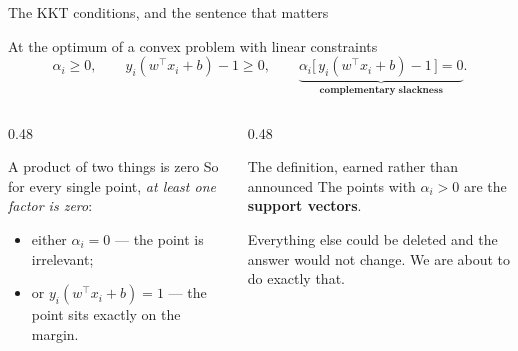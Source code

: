 \documentclass[aspectratio=169]{beamer}
\begin{document}
\begin{frame}[shrink=5]{The KKT conditions, and the sentence that matters}
  \begin{block}{At the optimum of a convex problem with linear constraints}
    \[
      \alpha_i \ge 0, \qquad
      y_i(w^\top x_i + b) - 1 \ge 0, \qquad
      \underbrace{\alpha_i\bigl[\,y_i(w^\top x_i + b) - 1\,\bigr] = 0}
        _{\textbf{complementary slackness}} .
    \]
  \end{block}
  \begin{columns}[T]
    \begin{column}{0.48\textwidth}
      \begin{exampleblock}{A product of two things is zero}
        So for every single point, \emph{at least one factor is zero}:
        \begin{itemize}
          \item either $\alpha_i = 0$ --- the point is irrelevant;
          \item or $y_i(w^\top x_i + b) = 1$ --- the point sits exactly on
            the margin.
        \end{itemize}
      \end{exampleblock}
    \end{column}
    \begin{column}{0.48\textwidth}
      \begin{alertblock}{The definition, earned rather than announced}
        \centering\large
        The points with $\alpha_i > 0$ are the\\ \textbf{support vectors}.

        \smallskip
        \normalsize Everything else could be deleted and the answer would not
        change. We are about to do exactly that.
      \end{alertblock}
    \end{column}
  \end{columns}
\end{frame}
\end{document}
